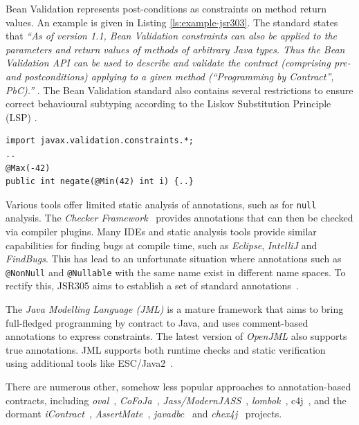 \documentclass[a4paper,UKenglish]{lipics-v2016}
\begin{document}
Bean Validation represents post-conditions as constraints on method return values.  An example is given in Listing \ref{ls:example-jsr303}. The standard states that \textit{``As of version 1.1, Bean Validation constraints can also be applied to the parameters and return values of methods of arbitrary Java types. Thus the Bean Validation API can be used to describe and validate the contract (comprising pre- and postconditions) applying to a given method (``Programming by Contract'', PbC).''} \cite[sect. 1.2]{JSR349}. The Bean Validation standard also contains several restrictions to ensure correct behavioural subtyping according to the Liskov Substitution Principle (LSP) \cite[sect. 4.5.5]{JSR349}. 


\begin{lstlisting}[float,floatplacement=T,caption=Using JSR303 annotations for pre- and post-conditions,frame=tlrb,columns=flexible,label=ls:example-jsr303]
import javax.validation.constraints.*;
..
@Max(-42) 
public int negate(@Min(42) int i) {..}
\end{lstlisting}


 {Various} tools offer limited static analysis of annotations, such as for \texttt{null} analysis.  The \textit{Checker Framework}~\cite{papi2008practical} provides annotations that can then be checked via compiler plugins.  Many IDEs and static analysis tools provide similar capabilities for finding bugs at compile time, such as \textit{Eclipse}, \textit{IntelliJ} and \textit{FindBugs}. This has lead to an unfortunate situation where annotations such as \texttt{@NonNull} and \texttt{@Nullable} with the same name exist in different name spaces.  To rectify this, JSR305 aims to establish a set of standard annotations~\cite{JSR305}. 

The \textit{Java Modelling Language (JML)} is a mature framework that aims to bring full-fledged programming by contract to Java, and uses comment-based annotations to express constraints. The latest version of \textit{OpenJML} also supports true annotations. JML supports both runtime checks and static verification~\cite{LCCRC05} using additional tools like ESC/Java2~\cite{CK04}.

There are numerous other, somehow less popular approaches to annotation-based contracts, including \textit{oval}~\cite{oval}, \textit{CoFoJa}~\cite{cofoja}, \textit{Jass/ModernJASS}~\cite{bartetzko2001jass}, \textit{lombok}~\cite{lombok}, c4j~\cite{c4j}, and the dormant \textit{iContract}~\cite{icontract}, \textit{AssertMate}~\cite{c2com-dbc}, \textit{javadbc}~\cite{javadbc} and \textit{chex4j}~\cite{chex4j} projects. 
\end{document}
